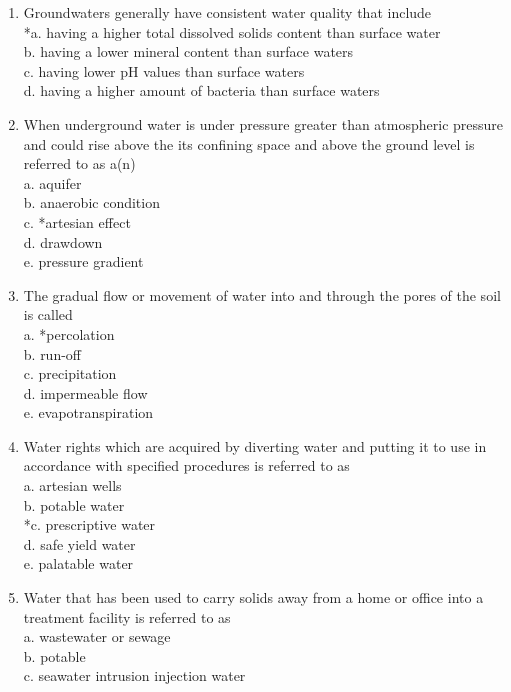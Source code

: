 \begin{enumerate}
\item Groundwaters generally have consistent water quality that include\\
*a. having a higher total dissolved solids content than surface water\\
b. having a lower mineral content than surface waters\\
c. having lower $\mathrm{pH}$ values than surface waters\\
d. having a higher amount of bacteria than surface waters\\
\item When underground water is under pressure greater than atmospheric pressure and could rise above the its confining space and above the ground level is referred to as a(n)\\
a. aquifer\\
b. anaerobic condition\\
c. *artesian effect\\
d. drawdown\\
e. pressure gradient\\
\item The gradual flow or movement of water into and through the pores of the soil is called\\
a. *percolation\\
b. run-off\\
c. precipitation\\
d. impermeable flow\\
e. evapotranspiration\\
\item Water rights which are acquired by diverting water and putting it to use in accordance with specified procedures is referred to as\\
a. artesian wells\\
b. potable water\\
*c. prescriptive water\\
d. safe yield water\\
e. palatable water\\
\item Water that has been used to carry solids away from a home or office into a treatment facility is referred to as\\
a. wastewater or sewage\\
b. potable\\
c. seawater intrusion injection water\\

\end{enumerate}
